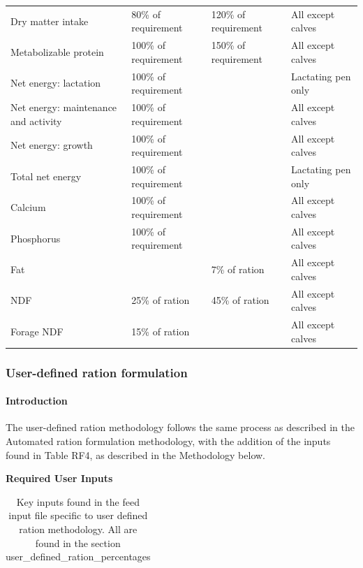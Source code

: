 \documentclass{article}
\begin{document}
\begin{refsection}
\begin{longtable}{@{} L{3.5cm} L{3cm} L{3cm} L{3cm} @{}}
Dry matter intake & 80\% of requirement & 120\% of requirement & All except calves \\
Metabolizable protein & 100\% of requirement & 150\% of requirement & All except calves \\
Net energy: lactation & 100\% of requirement &  & Lactating pen only \\
Net energy: maintenance and activity & 100\% of requirement &  & All except calves \\
Net energy: growth & 100\% of requirement &  & All except calves \\
Total net energy & 100\% of requirement &  & Lactating pen only \\
Calcium & 100\% of requirement &  & All except calves \\
Phosphorus & 100\% of requirement &  & All except calves \\
Fat &  & 7\% of ration & All except calves \\
NDF & 25\% of ration & 45\% of ration & All except calves \\
Forage NDF & 15\% of ration &  & All except calves \\



\end{longtable}






\subsubsection{User-defined ration formulation}
\paragraph{Introduction}
The user-defined ration methodology follows the same process as described in the Automated ration formulation methodology, with the addition of the inputs found in Table RF4, as described in the Methodology below.

\textbf{Required User Inputs}

\renewcommand{\arraystretch}{1.4} %

\begin{longtable}{@{} L{3.5cm} L{5.5cm} L{4.5cm} C{2cm} C{2cm} @{}}
\caption{Key inputs found in the feed input file specific to user defined ration methodology. All are found in the section user\_defined\_ration\_percentages} \\
\toprule


\end{longtable}
\end{refsection}
\end{document}
